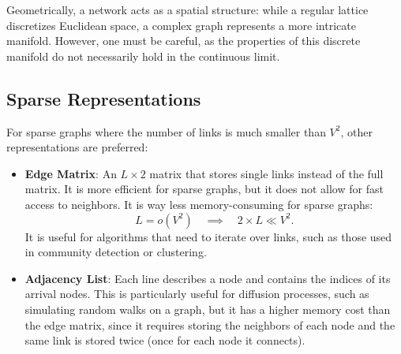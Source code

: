 Geometrically, a network acts as a spatial structure: while a regular lattice discretizes Euclidean space, a complex graph represents a more intricate manifold. However, one must be careful, as the properties of this discrete manifold do not necessarily hold in the continuous limit.

\subsection{Sparse Representations}
For sparse graphs where the number of links is much smaller than $V^2$, other representations are preferred:
\begin{itemize}
    \item \textbf{Edge Matrix}: An $L \times 2$ matrix that stores single links instead of the full matrix. It is more efficient for sparse graphs, but it does not allow for fast access to neighbors. It is way less memory-consuming for sparse graphs:
          \[
              L = o(V^2) \quad \implies \quad 2\times L \ll V^2.
          \]
          It is useful for algorithms that need to iterate over links, such as those used in community detection or clustering.
    \item \textbf{Adjacency List}: Each line describes a node and contains the indices of its arrival nodes. This is particularly useful for diffusion processes, such as simulating random walks on a graph, but it has a higher memory cost than the edge matrix, since it requires storing the neighbors of each node and the same link is stored twice (once for each node it connects).
\end{itemize}

